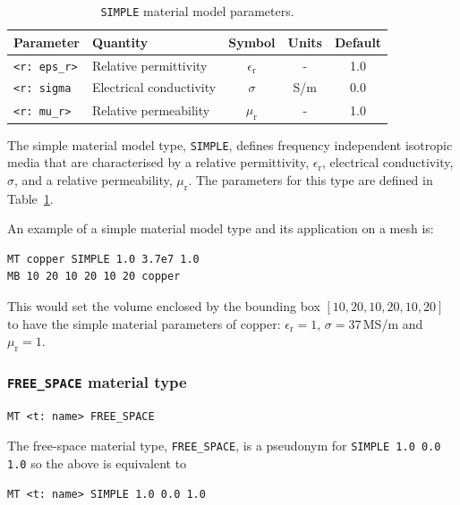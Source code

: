 \documentclass[onecolumn,a4paper]{article}
\numberwithin{equation}{section}
\begin{document}
\begin{table}[ht]
\begin{center}
\begin{tabular}{|l|l|c|c|c|}
\hline
Parameter             &Quantity                &Symbol                &Units    &Default  \\  
\hline
\texttt{<r:~eps\_r>}  &Relative permittivity   &$\epsilon_\mathrm{r}$ &-        &1.0      \\
\texttt{<r:~sigma}    &Electrical conductivity &$\sigma$              &S/m      &0.0      \\
\texttt{<r:~mu\_r>}   &Relative permeability   &$\mu_\mathrm{r}$      &-        &1.0      \\ 
\hline
\end{tabular}
\caption{\label{tb:mbsimple}\texttt{SIMPLE} material model parameters.}
\end{center}
\end{table}

The simple material model type, \texttt{SIMPLE}, defines frequency independent isotropic media that
are characterised by a relative permittivity, $\epsilon_\mathrm{r}$, electrical conductivity,
$\sigma$, and a relative permeability, $\mu_\mathrm{r}$. The parameters for this type are defined 
in Table~\ref{tb:mbsimple}.

An example of a simple material model type and its application on a mesh is:
\begin{verbatim}
MT copper SIMPLE 1.0 3.7e7 1.0
MB 10 20 10 20 10 20 copper
\end{verbatim}
This would set the volume enclosed by the bounding box $[10,20,10,20,10,20]$ to have 
the simple material parameters of copper: $\epsilon_\mathrm{r}=1$, $\sigma=37$\,MS/m and 
$\mu_\mathrm{r}=1$.

\subsubsection{\texttt{FREE\_SPACE} material type}

\begin{verbatim}
MT <t: name> FREE_SPACE
\end{verbatim}

The free-space material type, \texttt{FREE\_SPACE}, is a pseudonym for \texttt{SIMPLE 1.0 0.0 1.0}
so the above is equivalent to
\begin{verbatim}
MT <t: name> SIMPLE 1.0 0.0 1.0
\end{verbatim}
\end{document}
